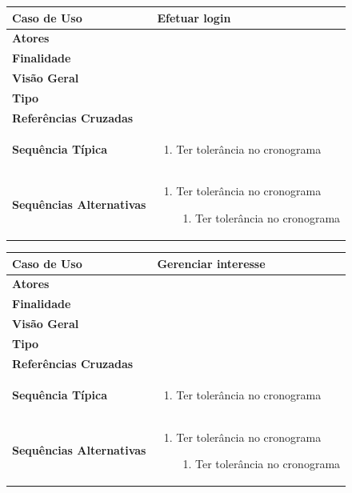 \documentclass[a4paper,11pt]{article}
\begin{document}
\begin{table}[H]
		\begin{tabularx}{\textwidth}{|l|X|}
		\hline
			\textbf{Caso de Uso} &  Efetuar login \\ \hline
			\textbf{Atores} &    \\ \hline
			\textbf{Finalidade} &   \\ \hline
			\textbf{Visão Geral} &  \\ \hline
			\textbf{Tipo} &  \\ \hline
			\textbf{Referências Cruzadas} &  \\ \hline
			\textbf{Sequência Típica} & 
			\begin{enumerate}
			\item Ter tolerância no cronograma
			\end{enumerate} \\ \hline
			\textbf{Sequências Alternativas} & 
			\begin{enumerate}
			\item Ter tolerância no cronograma
			\begin{enumerate}
			\item Ter tolerância no cronograma
			\end{enumerate}
			\end{enumerate} \\ \hline
		\end{tabularx}
\end{table}

\begin{table}[H]
		\begin{tabularx}{\textwidth}{|l|X|}
		\hline
			\textbf{Caso de Uso} &  Gerenciar interesse \\ \hline
			\textbf{Atores} &    \\ \hline
			\textbf{Finalidade} &   \\ \hline
			\textbf{Visão Geral} &  \\ \hline
			\textbf{Tipo} &  \\ \hline
			\textbf{Referências Cruzadas} &  \\ \hline
			\textbf{Sequência Típica} & 
			\begin{enumerate}
			\item Ter tolerância no cronograma
			\end{enumerate} \\ \hline
			\textbf{Sequências Alternativas} & 
			\begin{enumerate}
			\item Ter tolerância no cronograma
			\begin{enumerate}
			\item Ter tolerância no cronograma
			\end{enumerate}
			\end{enumerate} \\ \hline
		\end{tabularx}
\end{table}
\end{document}
